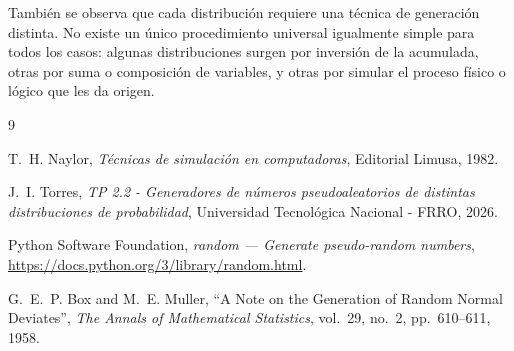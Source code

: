 \documentclass{article}
\begin{document}
También se observa que cada distribución requiere una técnica de generación
distinta. No existe un único procedimiento universal igualmente simple para
todos los casos: algunas distribuciones surgen por inversión de la acumulada,
otras por suma o composición de variables, y otras por simular el proceso físico
o lógico que les da origen.



\begin{thebibliography}{9}

T.~H. Naylor, \textit{Técnicas de simulación en computadoras},
Editorial Limusa, 1982.

J.~I. Torres, \textit{TP 2.2 - Generadores de números pseudoaleatorios de
distintas distribuciones de probabilidad}, Universidad Tecnológica Nacional -
FRRO, 2026.

Python Software Foundation, \textit{random --- Generate pseudo-random numbers},
\url{https://docs.python.org/3/library/random.html}.

G.~E.~P. Box and M.~E. Muller, ``A Note on the Generation of Random Normal
Deviates'', \textit{The Annals of Mathematical Statistics}, vol.~29, no.~2,
pp.~610--611, 1958.

\end{thebibliography}
\end{document}
